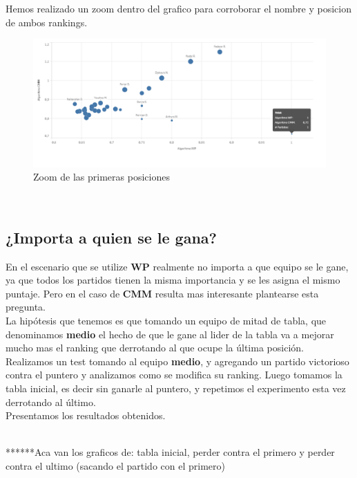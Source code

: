 Hemos realizado un zoom dentro del grafico para corroborar el nombre y posicion de ambos rankings.
\\

\begin{figure}[H]
\centering
\includegraphics[width=1\textwidth]{IMG/comparativa WP - CMM zoom.png}
\caption{Zoom de las primeras posiciones}
\label{fig:Zoom de las primeras posiciones}
\end{figure}

\\

\subsection{¿Importa a quien se le gana?}


En el escenario que se utilize \textbf{WP} realmente no importa a que equipo se le gane, ya que todos los partidos tienen la misma importancia y se les asigna el mismo puntaje. Pero en el caso de \textbf{CMM} resulta mas interesante plantearse esta pregunta. \\

La hipótesis que tenemos es que tomando un equipo de mitad de tabla, que denominamos \textbf{medio} el hecho de que le gane al lider de la tabla va a mejorar mucho mas el ranking que derrotando al que ocupe la última posición. \\

Realizamos un test tomando al equipo \textbf{medio}, y agregando un partido victorioso contra el puntero y analizamos como se modifica su ranking. Luego tomamos la tabla inicial, es decir sin ganarle al puntero, y repetimos el experimento esta vez derrotando al último. \\

Presentamos los resultados obtenidos.

\\


******Aca van los graficos de: tabla inicial, perder contra el primero y perder contra el ultimo (sacando el partido con el primero)

